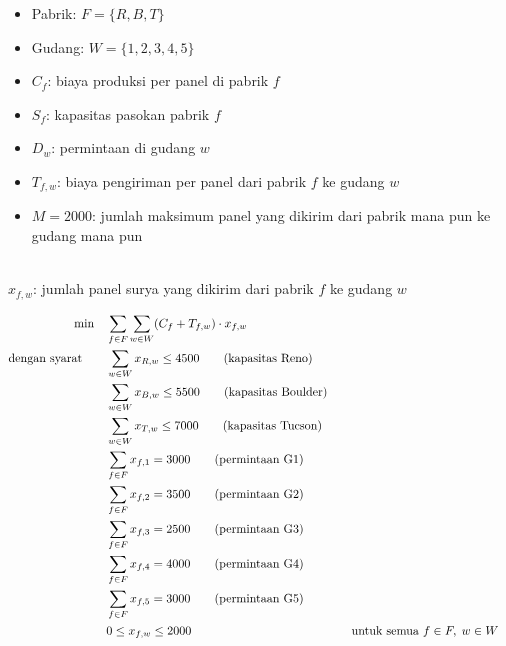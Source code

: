 \begin{solution}

\smallskip {}
\begin{itemize}
\item Pabrik: \( F = \{R, B, T\} \)
\item Gudang: \( W = \{1, 2, 3, 4, 5\} \)
\end{itemize}

\smallskip {}
\begin{itemize}
\item \( C_f \): biaya produksi per panel di pabrik \( f \)
\item \( S_f \): kapasitas pasokan pabrik \( f \)
\item \( D_w \): permintaan di gudang \( w \)
\item \( T_{f,w} \): biaya pengiriman per panel dari pabrik \( f \) ke gudang \( w \)
\item \( M = 2000 \): jumlah maksimum panel yang dikirim dari pabrik mana pun ke gudang mana pun
\end{itemize}

\smallskip {} \\
\( x_{f,w} \): jumlah panel surya yang dikirim dari pabrik \( f \) ke gudang \( w \)

\smallskip {}
\begin{align*}
\min \quad & \sum_{f \in F} \sum_{w \in W} (C_f + T_{f,w}) \cdot x_{f,w} \\
\mbox{dengan syarat}\quad \quad 
& \sum_{w \in W} x_{R,w} \leq 4500   \tag{kapasitas Reno} \\
& \sum_{w \in W} x_{B,w} \leq 5500   \tag{kapasitas Boulder} \\
& \sum_{w \in W} x_{T,w} \leq 7000   \tag{kapasitas Tucson} \\
& \sum_{f \in F} x_{f,1} = 3000   \tag{permintaan G1} \\
& \sum_{f \in F} x_{f,2} = 3500   \tag{permintaan G2} \\
& \sum_{f \in F} x_{f,3} = 2500   \tag{permintaan G3} \\
& \sum_{f \in F} x_{f,4} = 4000   \tag{permintaan G4} \\
& \sum_{f \in F} x_{f,5} = 3000   \tag{permintaan G5} \\
& 0 \leq x_{f,w} \leq 2000 &&\quad \mbox{untuk semua } f \in F,\; w \in W \\
\end{align*}

\end{solution}

